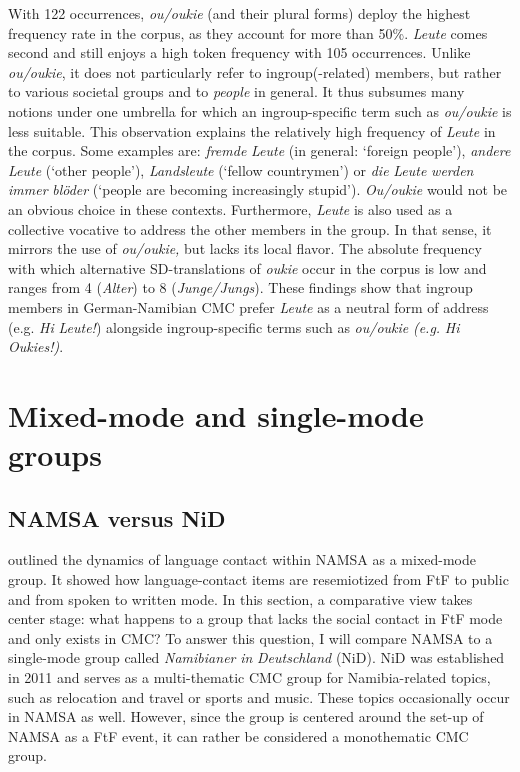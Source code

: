 \documentclass[output=paper]{langsci/langscibook}
\begin{document}
With 122 occurrences, \textit{ou/oukie} (and their plural forms) deploy the highest frequency rate in the corpus, as they account for more than 50\%. \textit{Leute} comes second and still enjoys a high token frequency with 105 occurrences. Unlike \textit{ou/oukie}, it does not particularly refer to ingroup(-related) members, but rather to various societal groups and to \textit{people} in general. It thus subsumes many notions under one umbrella for which an ingroup-specific term such as \textit{ou/oukie} is less suitable. This observation explains the relatively high frequency of \textit{Leute} in the corpus. Some examples are: \textit{fremde} \textit{Leute} (in general: ‘foreign people’), \textit{andere} \textit{Leute} (‘other people’), \textit{Landsleute} (‘fellow countrymen’) or \textit{die} \textit{Leute} \textit{werden} \textit{immer} \textit{blöder} (‘people are becoming increasingly stupid’). \textit{Ou/oukie} would not be an obvious choice in these contexts. Furthermore, \textit{Leute} is also used as a collective vocative to address the other members in the group. In that sense, it mirrors the use of \textit{ou/oukie,} but lacks its local flavor. The absolute frequency with which alternative SD-translations of \textit{oukie} occur in the corpus is low and ranges from 4 (\textit{Alter}) to 8 (\textit{Junge/Jungs}). These findings show that ingroup members in German-Namibian CMC prefer \textit{Leute} as a neutral form of address (e.g. \textit{Hi} \textit{Leute!}) alongside ingroup-specific terms such as \textit{ou/oukie} \textit{(e.g.} \textit{Hi} \textit{Oukies!)}.

 
 \section{Mixed-mode and single-mode groups}
\label{sec:radke:4}
 
  \subsection{NAMSA versus NiD}
  \label{sec:radke:4.1}
 

 outlined the dynamics of language contact within NAMSA as a mixed-mode group. It showed how language-contact items are resemiotized from FtF to public and from spoken to written mode. In this section, a comparative view takes center stage: what happens to a group that lacks the social contact in FtF mode and only exists in CMC? To answer this question, I will compare  NAMSA to a single-mode group called \textit{Namibianer} \textit{in} \textit{Deutschland} (NiD). NiD was established in 2011 and serves as a multi-thematic CMC group for Namibia-related topics, such as relocation and travel or sports and music. These topics occasionally occur in NAMSA as well. However, since the group is centered around the set-up of NAMSA as a FtF event, it can rather be considered a monothematic CMC group. 
\end{document}
